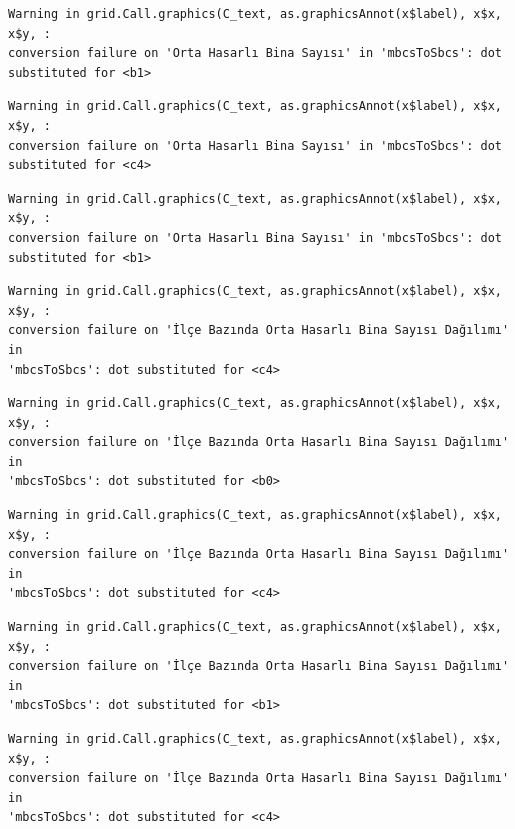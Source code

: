 \documentclass[
  11pt,
  a4paper,
  DIV=11,
  numbers=noendperiod]{scrartcl}
\begin{document}
\begin{verbatim}
Warning in grid.Call.graphics(C_text, as.graphicsAnnot(x$label), x$x, x$y, :
conversion failure on 'Orta Hasarlı Bina Sayısı' in 'mbcsToSbcs': dot
substituted for <b1>
\end{verbatim}

\begin{verbatim}
Warning in grid.Call.graphics(C_text, as.graphicsAnnot(x$label), x$x, x$y, :
conversion failure on 'Orta Hasarlı Bina Sayısı' in 'mbcsToSbcs': dot
substituted for <c4>
\end{verbatim}

\begin{verbatim}
Warning in grid.Call.graphics(C_text, as.graphicsAnnot(x$label), x$x, x$y, :
conversion failure on 'Orta Hasarlı Bina Sayısı' in 'mbcsToSbcs': dot
substituted for <b1>
\end{verbatim}

\begin{verbatim}
Warning in grid.Call.graphics(C_text, as.graphicsAnnot(x$label), x$x, x$y, :
conversion failure on 'İlçe Bazında Orta Hasarlı Bina Sayısı Dağılımı' in
'mbcsToSbcs': dot substituted for <c4>
\end{verbatim}

\begin{verbatim}
Warning in grid.Call.graphics(C_text, as.graphicsAnnot(x$label), x$x, x$y, :
conversion failure on 'İlçe Bazında Orta Hasarlı Bina Sayısı Dağılımı' in
'mbcsToSbcs': dot substituted for <b0>
\end{verbatim}

\begin{verbatim}
Warning in grid.Call.graphics(C_text, as.graphicsAnnot(x$label), x$x, x$y, :
conversion failure on 'İlçe Bazında Orta Hasarlı Bina Sayısı Dağılımı' in
'mbcsToSbcs': dot substituted for <c4>
\end{verbatim}

\begin{verbatim}
Warning in grid.Call.graphics(C_text, as.graphicsAnnot(x$label), x$x, x$y, :
conversion failure on 'İlçe Bazında Orta Hasarlı Bina Sayısı Dağılımı' in
'mbcsToSbcs': dot substituted for <b1>
\end{verbatim}

\begin{verbatim}
Warning in grid.Call.graphics(C_text, as.graphicsAnnot(x$label), x$x, x$y, :
conversion failure on 'İlçe Bazında Orta Hasarlı Bina Sayısı Dağılımı' in
'mbcsToSbcs': dot substituted for <c4>
\end{verbatim}
\end{document}
